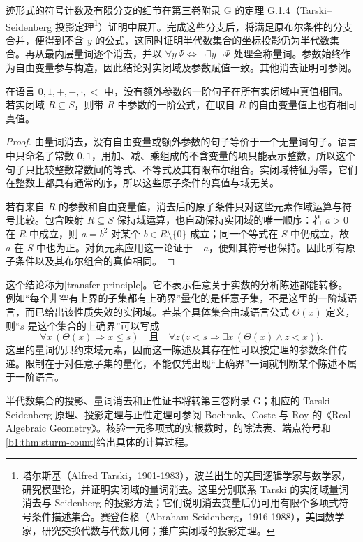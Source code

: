 \begin{proofsketch}
	迹形式的符号计数及有限分支的细节在第三卷附录 G 的定理 G.1.4（Tarski--Seidenberg 投影定理\footnote{塔尔斯基（Alfred Tarski，1901-1983），波兰出生的美国逻辑学家与数学家，研究模型论，并证明实闭域的量词消去。这里分别联系 Tarski 的实闭域量词消去与 Seidenberg 的投影方法；它们说明消去变量后仍可用有限个多项式符号条件描述集合。赛登伯格（Abraham Seidenberg，1916-1988），美国数学家，研究交换代数与代数几何；推广实闭域的投影定理。}）证明中展开。完成这些分支后，将满足原布尔条件的分支合并，便得到不含 \(y\) 的公式，这同时证明半代数集合的坐标投影仍为半代数集合。再从最内层量词逐个消去，并以 \(\forall y\,\Psi\iff\neg\exists y\,\neg\Psi\) 处理全称量词。参数始终作为自由变量参与构造，因此结论对实闭域及参数赋值一致。其他消去证明可参阅\cite[Section 1.4]{BochnakCosteRoy1998RealAG}。
\end{proofsketch}

\begin{corollary}[传递原理]\label{b1:cor:E-transfer-principle}
	在语言 \(0,1,+,-,\cdot,<\) 中，没有额外参数的一阶句子在所有实闭域中真值相同。若实闭域 \(R\subseteq S\)，则带 \(R\) 中参数的一阶公式，在取自 \(R\) 的自由变量值上也有相同真值。
\end{corollary}
\begin{proof}
	由量词消去，没有自由变量或额外参数的句子等价于一个无量词句子。语言中只命名了常数 \(0,1\)，用加、减、乘组成的不含变量的项只能表示整数，所以这个句子只比较整数常数间的等式、不等式及其有限布尔组合。实闭域特征为零，它们在整数上都具有通常的序，所以这些原子条件的真值与域无关。

	若有来自 \(R\) 的参数和自由变量值，消去后的原子条件只对这些元素作域运算与符号比较。包含映射 \(R\subseteq S\) 保持域运算，也自动保持实闭域的唯一顺序：若 \(a>0\) 在 \(R\) 中成立，则 \(a=b^2\) 对某个 \(b\in R\setminus\{0\}\) 成立；同一个等式在 \(S\) 中仍成立，故 \(a\) 在 \(S\) 中也为正。对负元素应用这一论证于 \(-a\)，便知其符号也保持。因此所有原子条件以及其布尔组合的真值相同。
\end{proof}

这个结论称为[transfer principle]。它不表示任意关于实数的分析陈述都能转移。例如“每个非空有上界的子集都有上确界”量化的是任意子集，不是这里的一阶域语言，而已给出该性质失效的实闭域。若某个具体集合由域语言公式 \(\Theta(x)\) 定义，则“\(s\) 是这个集合的上确界”可以写成
\[
	\forall x\,(\Theta(x)\Rightarrow x\leq s) \quad\text{且}\quad \forall z\,\bigl(z<s\Rightarrow\exists x\,(\Theta(x)\land z<x)\bigr).
\]
这里的量词仍只约束域元素，因而这一陈述及其存在性可以按定理的参数条件传递。限制在于对任意子集的量化，不能仅凭出现“上确界”一词就判断某个陈述不属于一阶语言。

\ProseParagraphBreak
半代数集合的投影、量词消去和正性证书将转第三卷附录 G；相应的 Tarski--Seidenberg 原理、投影定理与正性定理可参阅 Bochnak、Coste 与 Roy 的《Real Algebraic Geometry》\cite[Sections 1.4, 2.2, 4.4]{BochnakCosteRoy1998RealAG}。核验一元多项式的实根数时，的除法表、端点符号和\cref{b1:thm:sturm-count}给出具体的计算过程。
